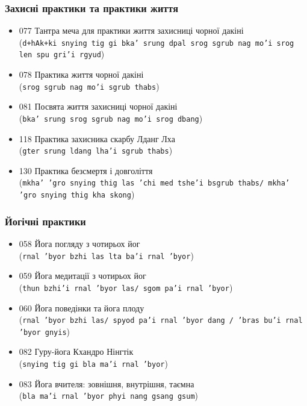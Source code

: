 \documentclass{article}
\begin{document}
\subsubsection{Захисні практики та практики життя}

\begingroup\raggedright
\begin{itemize}
\item 077 Тантра меча для практики життя захисниці чорної дакіні \\ (\texttt{d+hAk+ki snying tig gi bka' srung dpal srog sgrub nag mo'i srog len spu gri'i rgyud})
\item 078 Практика життя чорної дакіні \\ (\texttt{srog sgrub nag mo'i sgrub thabs})
\item 081 Посвята життя захисниці чорної дакіні \\ (\texttt{bka' srung srog sgrub nag mo'i srog dbang})
\item 118 Практика захисника скарбу Лданг Лха \\ (\texttt{gter srung ldang lha'i sgrub thabs})
\item 130 Практика безсмертя і довголіття \\ (\texttt{mkha' 'gro snying thig las 'chi med tshe'i bsgrub thabs/ mkha' 'gro snying thig kha skong})
\end{itemize}
\endgroup

\subsubsection{Йогічні практики}

\begingroup\raggedright
\begin{itemize}
\item 058 Йога погляду з чотирьох йог \\ (\texttt{rnal 'byor bzhi las lta ba'i rnal 'byor})
\item 059 Йога медитації з чотирьох йог \\ (\texttt{thun bzhi'i rnal 'byor las/ sgom pa'i rnal 'byor})
\item 060 Йога поведінки та йога плоду \\ (\texttt{rnal 'byor bzhi las/ spyod pa'i rnal 'byor dang / 'bras bu'i rnal 'byor gnyis})
\item 082 Гуру-йога Кхандро Нінгтік \\ (\texttt{snying tig gi bla ma'i rnal 'byor})
\item 083 Йога вчителя: зовнішня, внутрішня, таємна \\ (\texttt{bla ma'i rnal 'byor phyi nang gsang gsum})
\end{itemize}
\endgroup
\end{document}
